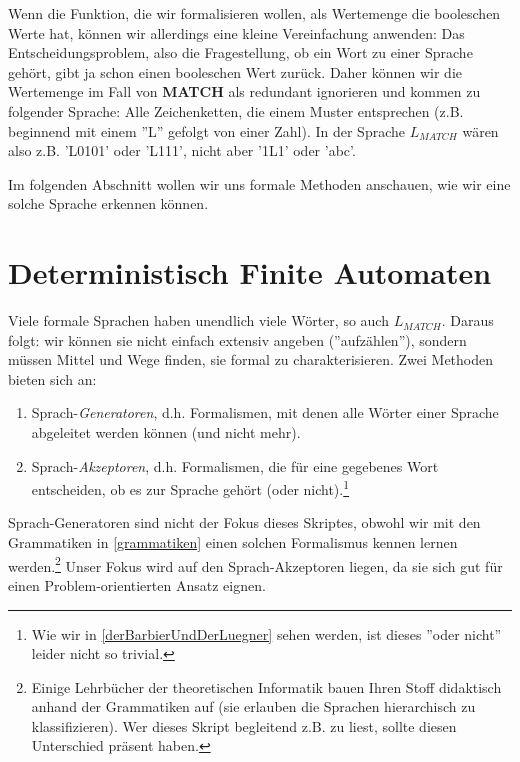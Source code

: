 Wenn die Funktion, die wir formalisieren wollen, als Wertemenge die booleschen Werte hat,
können wir allerdings eine kleine Vereinfachung anwenden:
Das Entscheidungsproblem, also die Fragestellung, ob ein Wort zu einer Sprache gehört,
gibt ja schon einen booleschen Wert zurück.
Daher können wir die Wertemenge im Fall von \textbf{MATCH} als redundant ignorieren
und kommen zu folgender Sprache:
Alle Zeichenketten, die einem Muster entsprechen
(z.B. beginnend mit einem ''L'' gefolgt von einer Zahl).
In der Sprache $L_{MATCH}$ wären also z.B. 'L0101' oder 'L111',
nicht aber '1L1' oder 'abc'.

Im folgenden Abschnitt wollen wir uns formale Methoden anschauen,
wie wir eine solche Sprache erkennen können.

\section{Deterministisch Finite Automaten}
Viele formale Sprachen haben unendlich viele Wörter,
so auch $L_{MATCH}$.
Daraus folgt: wir können sie nicht einfach extensiv angeben (''aufzählen''),
sondern müssen Mittel und Wege finden, sie formal zu charakterisieren.
Zwei Methoden bieten sich an:
\begin{enumerate}
    \item Sprach-\emph{Generatoren}, d.h. Formalismen,
        mit denen alle Wörter einer Sprache abgeleitet werden können
        (und nicht mehr).
    \item Sprach-\emph{Akzeptoren}, d.h. Formalismen,
        die für eine gegebenes Wort entscheiden,
        ob es zur Sprache gehört (oder nicht).\footnote{
            Wie wir in \autoref{derBarbierUndDerLuegner} sehen werden,
            ist dieses ''oder nicht'' leider nicht so trivial.}
\end{enumerate}

Sprach-Generatoren sind nicht der Fokus dieses Skriptes, obwohl wir mit den Grammatiken
in \autoref{grammatiken} einen solchen Formalismus kennen lernen werden.\footnote{
Einige Lehrbücher der theoretischen Informatik bauen Ihren Stoff didaktisch anhand der Grammatiken
auf (sie erlauben die Sprachen hierarchisch zu klassifizieren).
Wer dieses Skript begleitend z.B. zu \cite{schoening} liest,
sollte diesen Unterschied präsent haben.}
Unser Fokus wird auf den Sprach-Akzeptoren liegen,
da sie sich gut für einen Problem-orientierten Ansatz eignen.

